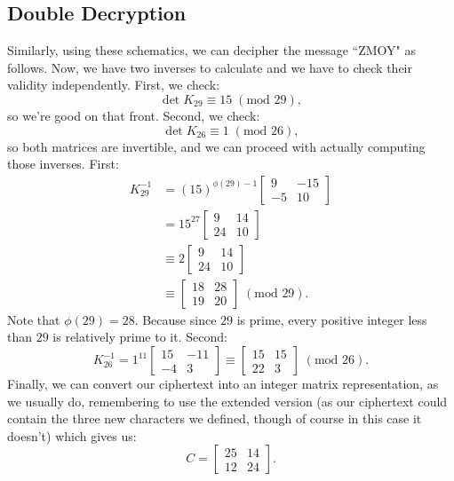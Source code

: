 \documentclass{article}
\begin{document}
\subsection{Double Decryption}
Similarly, using these schematics, we can decipher the message ``ZMOY" as follows. Now, we have two inverses to calculate and we have to check their validity independently. First, we check:
\[
    \det K_{29} \equiv 15 \; (\text{mod } 29),
\]
so we're good on that front. Second, we check:
\[
    \det K_{26} \equiv 1 \; (\text{mod } 26),
\]
so both matrices are invertible, and we can proceed with actually computing those inverses. First:
\begin{align*}
    K_{29}^{-1} &= (15)^{\phi(29) - 1} \begin{bmatrix}
        9 & -15 \\
        -5 & 10
    \end{bmatrix} \\
    &= 15^{27} \begin{bmatrix}
        9 & 14 \\
        24 & 10
    \end{bmatrix} \\
    &\equiv 2 \begin{bmatrix}
        9 & 14 \\
        24 & 10
    \end{bmatrix} \\
    &\equiv \begin{bmatrix}
        18 & 28 \\
        19 & 20
    \end{bmatrix} \; (\text{mod } 29).
\end{align*}
Note that $\phi(29) = 28$. Because since $29$ is prime, every positive integer less than $29$ is relatively prime to it. Second:
\[
    K_{26}^{-1} = 1^{11} \begin{bmatrix}
        15 & -11 \\
        -4 & 3
    \end{bmatrix} \equiv \begin{bmatrix}
        15 & 15 \\
        22 & 3
    \end{bmatrix} \; (\text{mod } 26).
\]
Finally, we can convert our ciphertext into an integer matrix representation, as we usually do, remembering to use the extended version (as our ciphertext could contain the three new characters we defined, though of course in this case it doesn't) which gives us:
\[
    C = \begin{bmatrix}
        25 & 14 \\
        12 & 24
    \end{bmatrix}.
\]
\end{document}
